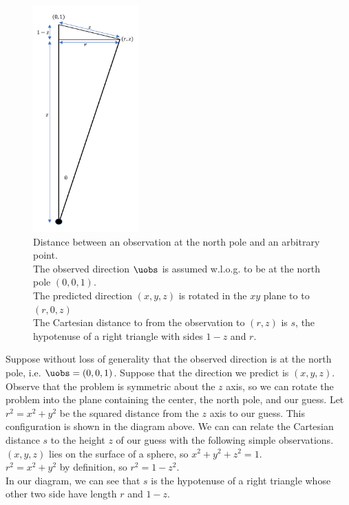 \begin{figure}[hbt!]
\begin{center}
\includegraphics[width=0.36\textwidth]{../figs/misc/orange_slice.png}
\caption{Distance between an observation at the north pole and an arbitrary point.\\
The observed direction $\uobs$ is assumed w.l.o.g. to be at the north pole $(0, 0, 1)$.\\
The predicted direction $(x,y,z)$ is rotated in the $xy$ plane to to $(r, 0, z)$ \\
The Cartesian distance to from the observation to $(r,z)$ is $s$, the hypotenuse of a right triangle with sides $1-z$ and $r$.}
\end{center}
\end{figure}
Suppose without loss of generality that the observed direction is at the north pole, i.e. $\uobs = (0, 0, 1)$.
Suppose that the direction we predict is $(x, y, z)$.
Observe that the problem is symmetric about the $z$ axis, so we can rotate the problem into 
the plane containing the center, the north pole, and our guess.
Let $r^2 = x^2 + y^2$ be the squared distance from the $z$ axis to our guess.
This configuration is shown in the diagram above.
We can can relate the Cartesian distance $s$ to the height $z$ of our guess with the following simple observations.\\
$(x, y, z)$ lies on the surface of a sphere, so $x^2 + y^2 + z^2 = 1$.\\
$r^2 = x^2 + y^2$ by definition, so $r^2 = 1 - z^2$.\\
In our diagram, we can see that $s$ is the hypotenuse of a right triangle whose other two side have length $r$ and $1-z$.
